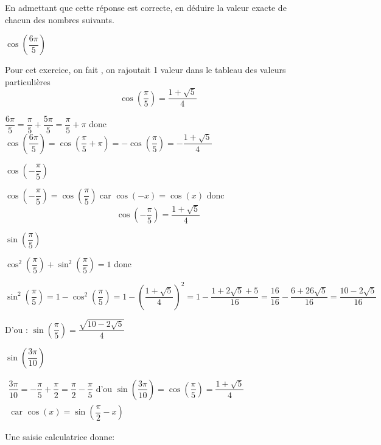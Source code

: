 \documentclass[11pt,a4paper]{article}  %
\begin{document}
En admettant que cette réponse est correcte, en déduire la valeur exacte de chacun des nombres suivants.
\begin{enumMet}
	\item $\cos \left(\dfrac{6 \pi}{5}\right)$
	\begin{corrBox}
		Pour cet exercice, on fait , on rajoutait 1 valeur dans le tableau des valeurs particulières
		$$
		\cos \left(\dfrac{\pi}{5}\right)=\dfrac{1+\sqrt{5}}{4}
		$$
		
		$\dfrac{6 \pi}{5}=\dfrac{\pi}{5}+\dfrac{5 \pi}{5}=\dfrac{\pi}{5}+\pi$ donc  $\cos \left(\dfrac{6 \pi}{5}\right)=\cos \left(\dfrac{\pi}{5}+\pi\right)=-\cos \left(\dfrac{\pi}{5}\right)=-\dfrac{1+\sqrt{5}}{4}$		
	\end{corrBox}
	\item $\cos \left(-\dfrac{\pi}{5}\right)$
	\begin{corrBox}
		$\cos \left(-\dfrac{\pi}{5}\right)=\cos \left(\dfrac{\pi}{5}\right)$ car $\cos (-x)=\cos (x)$ donc 
		$$
		\cos \left(-\dfrac{\pi}{5}\right)=\dfrac{1+\sqrt{5}}{4}
		$$
	\end{corrBox}
	\item $\sin \left(\dfrac{\pi}{5}\right)$
	\begin{corrBox}
		$\cos ^2\left(\dfrac{\pi}{5}\right)+\sin ^2\left(\dfrac{\pi}{5}\right)=1$
		donc 
		
		$\sin ^2\left(\dfrac{\pi}{5}\right)=1-\cos ^2\left(\dfrac{\pi}{5}\right)=1-\left(\dfrac{1+\sqrt{5}}{4}\right)^2=1-\dfrac{1+2 \sqrt{5}+5}{16}=\dfrac{16}{16}-\dfrac{6+26 \sqrt{5}}{16}=\dfrac{10-2 \sqrt{5}}{16}$
		
		D'ou : $\sin \left(\dfrac{\pi}{5}\right)=\dfrac{\sqrt{10-2 \sqrt{5}}}{4}$
				
	\end{corrBox}
	\item $\sin \left(\dfrac{3 \pi}{10}\right)$
	\begin{corrBox}
		$\begin{array}{r}\dfrac{3 \pi}{10}=-\dfrac{\pi}{5}+\dfrac{\pi}{2}=\dfrac{\pi}{2}-\dfrac{\pi}{5} \text { d'ou } \sin \left(\dfrac{3 \pi}{10}\right)=\cos \left(\dfrac{\pi}{5}\right)=\dfrac{1+\sqrt{5}}{4} \\ \text { car } \cos (x)=\sin \left(\dfrac{\pi}{2}-x\right)\end{array}$		
	\end{corrBox}
\end{enumMet}

\exercice{}

Une saisie calculatrice donne:
\end{document}

